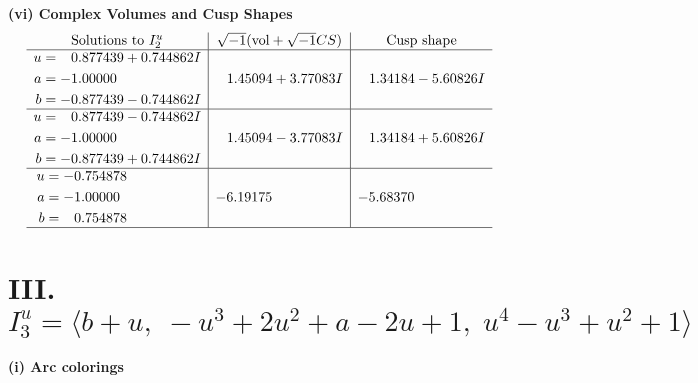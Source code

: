 \documentclass[1p]{elsarticle_modified}
\theoremstyle{definition}
\newcommand{\I}{\sqrt{-1}}
\begin{document}
\newpage\flushleft \textbf{(vi) Complex Volumes and Cusp Shapes}
$$\begin{array}{c|c|c}  
\text{Solutions to }I^u_{2}& \I (\text{vol} + \sqrt{-1}CS) & \text{Cusp shape}\\
 \hline 
\begin{aligned}
u &= \phantom{-}0.877439 + 0.744862 I \\
a &= -1.00000\phantom{ +0.000000I} \\
b &= -0.877439 - 0.744862 I\end{aligned}
 & \phantom{-}1.45094 + 3.77083 I & \phantom{-}1.34184 - 5.60826 I \\ \hline\begin{aligned}
u &= \phantom{-}0.877439 - 0.744862 I \\
a &= -1.00000\phantom{ +0.000000I} \\
b &= -0.877439 + 0.744862 I\end{aligned}
 & \phantom{-}1.45094 - 3.77083 I & \phantom{-}1.34184 + 5.60826 I \\ \hline\begin{aligned}
u &= -0.754878\phantom{ +0.000000I} \\
a &= -1.00000\phantom{ +0.000000I} \\
b &= \phantom{-}0.754878\phantom{ +0.000000I}\end{aligned}
 & -6.19175\phantom{ +0.000000I} & -5.68370\phantom{ +0.000000I}\\
 \hline 
 \end{array}$$\newpage\newpage\renewcommand{\arraystretch}{1}
\centering \section*{III. $I^u_{3}= \langle b+u,\;- u^3+2 u^2+a-2 u+1,\;u^4- u^3+u^2+1 \rangle$}
\flushleft \textbf{(i) Arc colorings}\\
\end{document}
